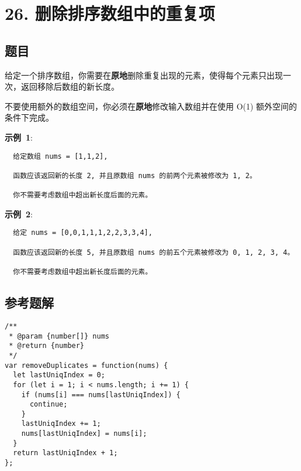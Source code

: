 \newpage
\section{26. 删除排序数组中的重复项}
\label{leetcode:26}

\subsection{题目}

给定一个排序数组，你需要在\textbf{原地}删除重复出现的元素，使得每个元素只出现一次，返回移除后数组的新长度。

不要使用额外的数组空间，你必须在\textbf{原地}修改输入数组并在使用 O(1) 额外空间的条件下完成。

\textbf{示例 1}:

\begin{verbatim}
  给定数组 nums = [1,1,2], 

  函数应该返回新的长度 2, 并且原数组 nums 的前两个元素被修改为 1, 2。 

  你不需要考虑数组中超出新长度后面的元素。
\end{verbatim}

\textbf{示例 2}:

\begin{verbatim}
  给定 nums = [0,0,1,1,1,2,2,3,3,4],

  函数应该返回新的长度 5, 并且原数组 nums 的前五个元素被修改为 0, 1, 2, 3, 4。

  你不需要考虑数组中超出新长度后面的元素。
\end{verbatim}

\subsection{参考题解}

\begin{verbatim}
/**
 * @param {number[]} nums
 * @return {number}
 */
var removeDuplicates = function(nums) {
  let lastUniqIndex = 0;
  for (let i = 1; i < nums.length; i += 1) {
    if (nums[i] === nums[lastUniqIndex]) {
      continue;
    }
    lastUniqIndex += 1;
    nums[lastUniqIndex] = nums[i];
  }
  return lastUniqIndex + 1;
};
\end{verbatim}
